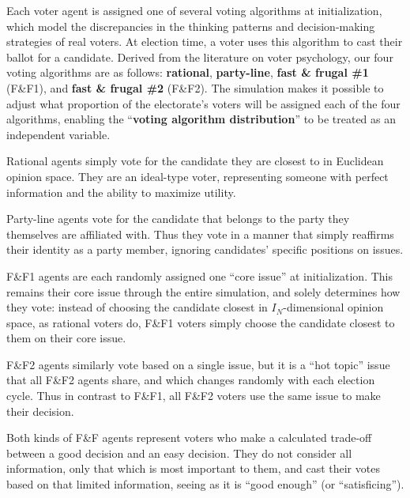 
Each voter agent is assigned one of several voting algorithms at
initialization, which model the discrepancies in the thinking patterns and
decision-making strategies of real voters. At election time, a voter uses this
algorithm to cast their ballot for a candidate. Derived from the literature on
voter psychology\cite[ch.2]{redlawsk_citizens_2020}, our four voting algorithms
are as follows: \textbf{rational}, \textbf{party-line}, \textbf{fast \& frugal
\#1} (F\&F1), and \textbf{fast \& frugal \#2} (F\&F2). The simulation makes it
possible to adjust what proportion of the electorate's voters will be assigned
each of the four algorithms, enabling the ``\textbf{voting algorithm
distribution}'' to be treated as an independent variable.

Rational agents simply vote for the candidate they are closest to in Euclidean
opinion space. They are an ideal-type voter, representing someone with perfect
information and the ability to maximize utility.

Party-line agents vote for the candidate that belongs to the party they
themselves are affiliated with. Thus they vote in a manner that simply
reaffirms their identity as a party member, ignoring candidates' specific
positions on issues.

F\&F1 agents are each randomly assigned one ``core issue'' at initialization.
This remains their core issue through the entire simulation, and solely
determines how they vote: instead of choosing the candidate closest in
$I_N$-dimensional opinion space, as rational voters do, F\&F1 voters simply
choose the candidate closest to them on their core issue.

F\&F2 agents similarly vote based on a single issue, but it is a ``hot topic''
issue that all F\&F2 agents share, and which changes randomly with each
election cycle. Thus in contrast to F\&F1, all F\&F2 voters use the same issue
to make their decision.

Both kinds of F\&F agents represent voters who make a calculated trade-off
between a good decision and an easy decision. They do not consider all
information, only that which is most important to them, and cast their votes
based on that limited information, seeing as it is ``good enough'' (or
``satisficing''\cite{simon_rational_1956}).

